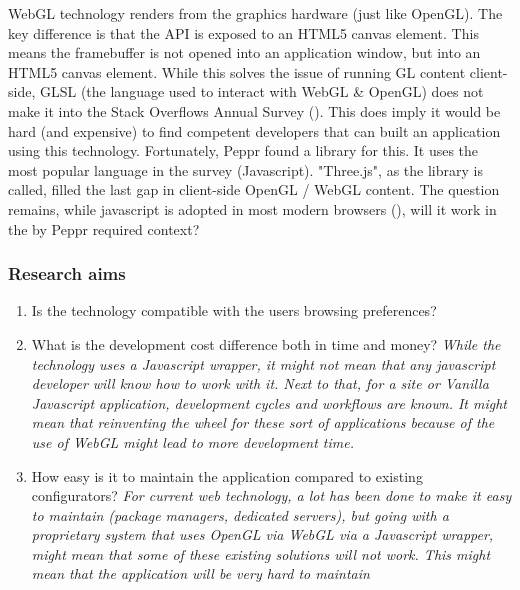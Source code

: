\cite{webGL}

WebGL technology renders from the graphics hardware (just like OpenGL). The key difference is that the API is exposed to an HTML5 canvas element. This means the framebuffer is not opened into an application window, but into an HTML5 canvas element. While this solves the issue of running GL content client-side, GLSL (the language used to interact with WebGL \& OpenGL) does not make it into the Stack Overflows Annual Survey (\cite{stackoverflowDeveloperSurvey}). This does imply it would be hard (and expensive) to find competent developers that can built an application using this technology.
Fortunately, Peppr found a library for this. It uses the most popular language in the survey (Javascript). "Three.js", as the library is called, filled the last gap in client-side OpenGL / WebGL content. The question remains, while javascript is adopted in most modern browsers (\cite{javascriptSupport}), will it work in the by Peppr required context?

\subsubsection{Research aims}
\begin{enumerate}
	\item {Is the technology compatible with the users browsing preferences?}
	\item {What is the development cost difference both in time and money? \textit{While the technology uses a Javascript wrapper, it might not mean that any javascript developer will know how to work with it. Next to that, for a site or Vanilla Javascript application, development cycles and workflows are known. It might mean that reinventing the wheel for these sort of applications because of the use of WebGL might lead to more development time.}}
	\item {How easy is it to maintain the application compared to existing configurators? \textit{For current web technology, a lot has been done to make it easy to maintain (package managers, dedicated servers), but going with a proprietary system that uses OpenGL via WebGL via a Javascript wrapper, might mean that some of these existing solutions will not work. This might mean that the application will be very hard to maintain}}
\end{enumerate}


\newpage





